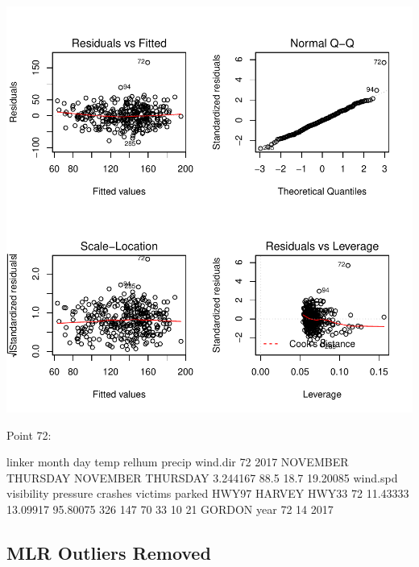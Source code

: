 \documentclass[11pt, a4paper]{article}
\begin{document}
\includegraphics{regression-007}

\begin{Schunk}
\begin{Soutput}
Point 72:
\end{Soutput}
\begin{Soutput}
                   linker    month      day     temp relhum precip wind.dir
72 2017 NOVEMBER THURSDAY NOVEMBER THURSDAY 3.244167   88.5   18.7 19.20085
   wind.spd visibility pressure crashes victims parked HWY97 HARVEY HWY33
72 11.43333   13.09917 95.80075     326     147     70    33     10    21
   GORDON year
72     14 2017
\end{Soutput}
\end{Schunk}




\pagebreak
\subsection{MLR Outliers Removed}
\end{document}
